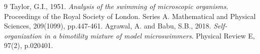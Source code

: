 \documentclass[12pt]{article}
\begin{document}
\newpage

\begin{thebibliography}{9}
Taylor, G.I., 1951. \textit{Analysis of the swimming of microscopic organisms}. Proceedings of the Royal Society of London. Series A. Mathematical and Physical Sciences, 209(1099), pp.447-461.
Agrawal, A. and Babu, S.B., 2018. \textit{Self-organization in a bimotility mixture of model microswimmers}. Physical Review E, 97(2), p.020401.
\end{thebibliography}
\end{document}
